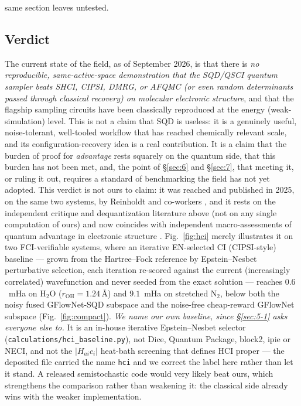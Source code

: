 \documentclass[onecolumn,a4paper]{quantumarticle}
\begin{document}
same section leaves untested.


\subsection{Verdict}\label{sec:5-5}

The current state of the field, as of September 2026, is that there is \emph{no reproducible, same-active-space demonstration that the SQD/QSCI quantum sampler beats SHCI, CIPSI, DMRG, or AFQMC (or even random determinants passed through classical recovery) on molecular electronic structure}, and that the flagship sampling circuits have been classically reproduced at the energy (weak-simulation) level. This is not a claim that SQD is useless: it is a genuinely useful, noise-tolerant, well-tooled workflow that has reached chemically relevant scale, and its configuration-recovery idea is a real contribution. It is a claim that the burden of proof for \emph{advantage} rests squarely on the quantum side, that this burden has not been met, and, the point of \S\ref{sec:6} and \S\ref{sec:7}, that meeting it, or ruling it out, requires a standard of benchmarking the field has not yet adopted. This verdict is not ours to claim: it was reached and published in 2025, on the same two systems, by Reinholdt and co-workers \cite{reinholdt2025}, and it rests on the independent critique and dequantization literature above (not on any single computation of ours) and now coincides with independent macro-assessments of quantum advantage in electronic structure \cite{lee2023,gundlach2025,legeza2026}. Fig.~\ref{fig:hci} merely illustrates it on two FCI-verifiable systems, where an iterative EN-selected CI (CIPSI-style) baseline --- grown from the Hartree--Fock reference by Epstein--Nesbet perturbative selection, each iteration re-scored against the current (increasingly correlated) wavefunction and never seeded from the exact solution --- reaches $0.6$~mHa on H$_2$O ($r_{\mathrm{OH}}{=}1.24\,$\AA) and $9.1$~mHa on stretched N$_2$, below both the noisy fused GFlowNet-SQD subspace and the noise-free cheap-reward GFlowNet subspace (Fig.~\ref{fig:compact}). \emph{We name our own baseline, since \S\ref{sec:5-1} asks everyone else to.} It is an in-house iterative Epstein--Nesbet selector (\texttt{calculations/hci\_baseline.py}), not Dice, Quantum Package, block2, ipie or NECI, and not the $|H_{ai}c_i|$ heat-bath screening that defines HCI proper --- the deposited file carried the name \texttt{hci} and we correct the label here rather than let it stand. A released semistochastic code would very likely beat ours, which strengthens the comparison rather than weakening it: the classical side already wins with the weaker implementation.
\end{document}
